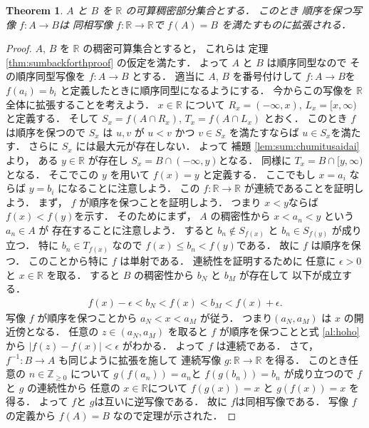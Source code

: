 \documentclass[leqno, a4paper, 12pt]{jsarticle}
\theoremstyle{plain}
\newtheorem{thm}{Theorem}[section]
\theoremstyle{definition}
\theoremstyle{remark}
\newcommand{\zz}{\mathbb{Z}}
\newcommand{\rr}{\mathbb{R}}
\numberwithin{equation}{section}
\begin{document}
\begin{thm}\label{thm:sum:junjodaiji}
$A$
と
$B$
を
$\rr$
の可算稠密部分集合とする．
このとき
順序を保つ写像
$f\colon  A\to B$は
同相写像
$f\colon  \rr\to \rr$で
$f(A)=B$
を満たすものに拡張される．
\end{thm}
\begin{proof}
$A$, 
$B$
を
$\rr$
の稠密可算集合とすると，
これらは
定理
\ref{thm:sumbackforthproof}
の仮定を満たす．
よって
$A$
と
$B$
は順序同型なので
その順序同型写像を
$f\colon  A\to B$
とする．
適当に
$A$,
 $B$
 を番号付けして
$f\colon  A\to B$を
$f(a_{i})=b_{i}$
と定義したときに順序同型になるようにする．
今からこの写像を
$\rr$
全体に拡張することを考えよう．
$x\in \rr$
について
$R_{x}=(-\infty, x)$, 
$L_{x}=[x, \infty)$
と定義する．
そして
$S_{x}=f(A\cap R_{x})$, 
$T_{x}=f(A\cap L_{x})$
とおく．
このとき
$f$
は順序を保つので
$S_{x}$
は
$u, v$
が
$u<v$
かつ
$v\in S_{x}$
を満たすならば
$u\in S_{x}$を満たす．
さらに
$S_{x}$
には最大元が存在しない．
よって
補題
\ref{lem:sum:chumitusaidai}
より，
ある
$y\in \rr$
が存在し
$S_{x}=B\cap (-\infty, y)$となる．
同様に
$T_{x}=B\cap [y, \infty)$
となる．
そこでこの
$y$
を用いて
$f(x)=y$
と定義する．
ここでもし
$x=a_{i}$
ならば
$y=b_{i}$
になることに注意しよう．
この
$f\colon  \rr\to \rr$
が連続であることを証明しよう．
まず，
$f$
が順序を保つことを証明しよう．
つまり
$x<y$ならば$f(x)<f(y)$を示す．
そのためにまず，
$A$
の稠密性から
$x<a_{n}<y$
という
$a_{n}\in A$
が
存在することに注意しよう．
すると
$b_{n}\not\in S_{f(x)}$
と
$b_{n}\in S_{f(y)}$
が成り立つ．
特に
$b_{n}\in T_{f(x)}$
なので
$f(x)\le b_{n}<f(y)$である．
故に
$f$
は順序を保つ．
このことから特に
$f$
は単射である．
連続性を証明するために
任意に
$\epsilon>0$
と
$x\in \rr$
を取る．
すると
$B$
の稠密性から
$b_{N}$
と
$b_{M}$
が存在して
以下が成立する．
\begin{align}\label{al:hoho}
f(x)-\epsilon <b_{N}<f(x)<b_{M}<f(x)+\epsilon.
\end{align}
写像
$f$
が順序を保つことから
$a_{N}<x<a_{M}$
が従う．
つまり$(a_{N}, a_{M})$
は
$x$
の開近傍となる．
任意の
$z\in (a_{N}, a_{M})$
を取ると
$f$
が順序を保つことと式
\eqref{al:hoho}
から
$|f(z)-f(x)|<\epsilon$
がわかる．
よって
$f$
は連続である．
さて，
$f^{-1}\colon  B\to A$
も同じように拡張を施して
連続写像
$g\colon  \rr\to \rr$
を得る．
このとき任意の
$n\in \zz_{\ge 0}$
について
$g(f(a_{n}))=a_{n}$と
$f(g(b_{n}))=b_{n}$
が成り立つので
$f$
と
$g$
の連続性から
任意の
$x\in \rr$について
$f(g(x))=x$
と
$g(f(x))=x$
を得る．
よって
$f$と
 $g$は互いに逆写像である．
 故に
 $f$は同相写像である．
 写像
$f$
の定義から
$f(A)=B$
なので定理が示された．
\end{proof}
\end{document}
